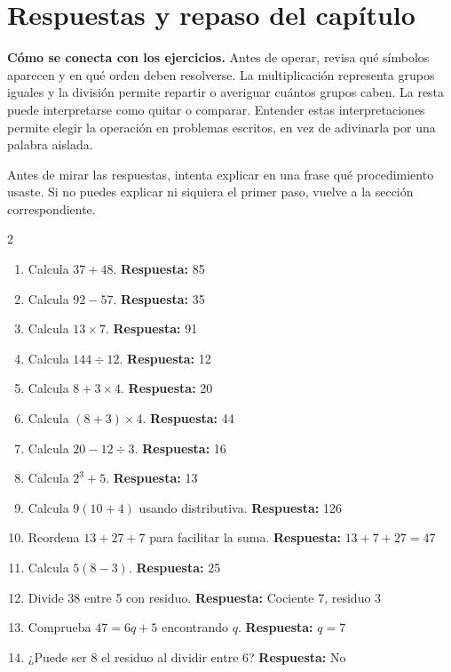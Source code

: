 \documentclass[10pt,oneside,openany]{book}
\begin{document}
\section{Respuestas y repaso del capítulo}

\textbf{Cómo se conecta con los ejercicios.} Antes de operar, revisa qué símbolos aparecen y en qué orden deben resolverse. La multiplicación representa grupos iguales y la división permite repartir o averiguar cuántos grupos caben. La resta puede interpretarse como quitar o comparar. Entender estas interpretaciones permite elegir la operación en problemas escritos, en vez de adivinarla por una palabra aislada.

Antes de mirar las respuestas, intenta explicar en una frase qué procedimiento usaste. Si no puedes explicar ni siquiera el primer paso, vuelve a la sección correspondiente.

\begin{multicols}{2}\begin{enumerate}

\item Calcula $37+48$. \textbf{Respuesta:} 85

\item Calcula $92-57$. \textbf{Respuesta:} 35

\item Calcula $13\times7$. \textbf{Respuesta:} 91

\item Calcula $144\div12$. \textbf{Respuesta:} 12

\item Calcula $8+3\times4$. \textbf{Respuesta:} 20

\item Calcula $(8+3)\times4$. \textbf{Respuesta:} 44

\item Calcula $20-12\div3$. \textbf{Respuesta:} 16

\item Calcula $2^3+5$. \textbf{Respuesta:} 13

\item Calcula $9(10+4)$ usando distributiva. \textbf{Respuesta:} 126

\item Reordena $13+27+7$ para facilitar la suma. \textbf{Respuesta:} $13+7+27=47$

\item Calcula $5(8-3)$. \textbf{Respuesta:} 25

\item Divide 38 entre 5 con residuo. \textbf{Respuesta:} Cociente 7, residuo 3

\item Comprueba $47=6q+5$ encontrando $q$. \textbf{Respuesta:} $q=7$

\item ¿Puede ser 8 el residuo al dividir entre 6? \textbf{Respuesta:} No

\end{enumerate}\end{multicols}
\end{document}
